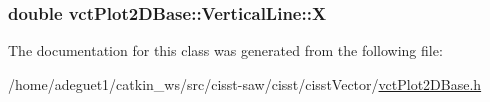 \hypertarget{classvct_plot2_d_base_1_1_vertical_line_a49c77c7144675b46d5a89342732b96eb}{
\subsubsection[{X}]{\setlength{\rightskip}{0pt plus 5cm}double vct\-Plot2\-D\-Base\-::\-Vertical\-Line\-::\-X\hspace{0.3cm}{\ttfamily [protected]}}}\label{classvct_plot2_d_base_1_1_vertical_line_a49c77c7144675b46d5a89342732b96eb}


The documentation for this class was generated from the following file\-:\begin{DoxyCompactItemize}
\item 
/home/adeguet1/catkin\-\_\-ws/src/cisst-\/saw/cisst/cisst\-Vector/\hyperlink{vct_plot2_d_base_8h}{vct\-Plot2\-D\-Base.\-h}\end{DoxyCompactItemize}
